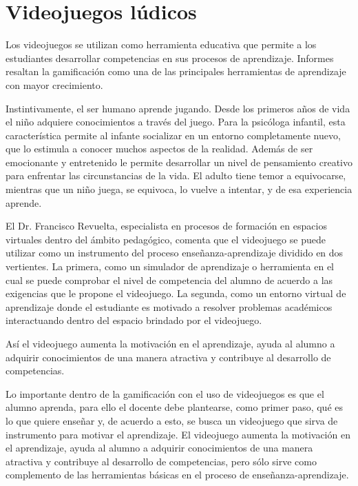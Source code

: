 \section{Videojuegos lúdicos}

Los videojuegos se utilizan como herramienta educativa que permite a los estudiantes desarrollar competencias en sus procesos de aprendizaje. Informes %
resaltan la gamificación %
como una de las principales herramientas de aprendizaje con mayor crecimiento.

Instintivamente, el ser humano aprende jugando. Desde los primeros años de vida el niño adquiere conocimientos a través del juego. Para la psicóloga infantil, esta característica permite al infante socializar en un entorno completamente nuevo, que lo estimula a conocer muchos aspectos de la realidad. Además de ser emocionante y entretenido le permite desarrollar un nivel de pensamiento creativo para enfrentar las circunstancias de la vida. El adulto tiene temor a equivocarse, mientras que un niño juega, se equivoca, lo vuelve a intentar, y de esa experiencia aprende.

El Dr. Francisco Revuelta, especialista en procesos de formación en espacios virtuales dentro del ámbito pedagógico, comenta que el videojuego se puede utilizar como un instrumento del proceso enseñanza-aprendizaje dividido en dos vertientes. 
La primera, como un simulador de aprendizaje o herramienta en el cual se puede comprobar el nivel de competencia del alumno de acuerdo a las exigencias que le propone el videojuego.  
La segunda, como un entorno virtual de aprendizaje donde el estudiante es motivado a resolver problemas académicos interactuando dentro del espacio brindado por el videojuego.

Así el videojuego aumenta la motivación en el aprendizaje, ayuda al alumno a adquirir conocimientos de una manera atractiva y contribuye al desarrollo de competencias.

Lo importante dentro de la gamificación con el uso de videojuegos es que el alumno aprenda, para ello el docente debe plantearse, como primer paso, qué es lo que quiere enseñar y, de acuerdo a esto, se busca un videojuego que sirva de instrumento para motivar el aprendizaje. El videojuego aumenta la motivación en el aprendizaje, ayuda al alumno a adquirir conocimientos de una manera atractiva y contribuye al desarrollo de competencias, pero sólo sirve como complemento de las herramientas básicas en el proceso de enseñanza-aprendizaje. 
